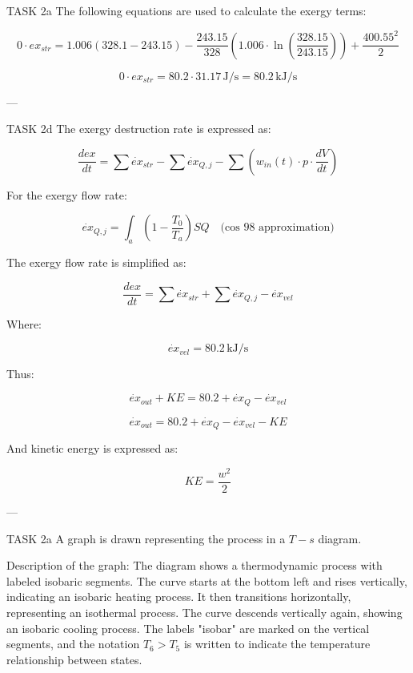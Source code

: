 TASK 2a  
The following equations are used to calculate the exergy terms:  

\[
0 \cdot ex_{str} = 1.006 (328.1 - 243.15) - \frac{243.15}{328} \left( 1.006 \cdot \ln \left( \frac{328.15}{243.15} \right) \right) + \frac{400.55^2}{2}
\]

\[
0 \cdot ex_{str} = 80.2 \cdot 31.17 \, \text{J/s} = 80.2 \, \text{kJ/s}
\]

---

TASK 2d  
The exergy destruction rate is expressed as:  

\[
\frac{d ex}{dt} = \sum \dot{ex}_{str} - \sum \dot{ex}_{Q,j} - \sum \left( w_{in}(t) \cdot p \cdot \frac{dV}{dt} \right)
\]

For the exergy flow rate:  

\[
\dot{ex}_{Q,j} = \int_a \left( 1 - \frac{T_0}{T_a} \right) SQ \quad \text{(cos 98 approximation)}
\]

The exergy flow rate is simplified as:  

\[
\frac{d ex}{dt} = \sum \dot{ex}_{str} + \sum \dot{ex}_{Q,j} - \dot{ex}_{vel}
\]

Where:  

\[
\dot{ex}_{vel} = 80.2 \, \text{kJ/s}
\]

Thus:  

\[
\dot{ex}_{out} + KE = 80.2 + \dot{ex}_{Q} - \dot{ex}_{vel}
\]

\[
\dot{ex}_{out} = 80.2 + \dot{ex}_{Q} - \dot{ex}_{vel} - KE
\]

And kinetic energy is expressed as:  

\[
KE = \frac{w^2}{2}
\]

---

TASK 2a  
A graph is drawn representing the process in a \( T-s \) diagram.  

Description of the graph:  
The diagram shows a thermodynamic process with labeled isobaric segments. The curve starts at the bottom left and rises vertically, indicating an isobaric heating process. It then transitions horizontally, representing an isothermal process. The curve descends vertically again, showing an isobaric cooling process. The labels "isobar" are marked on the vertical segments, and the notation \( T_6 > T_5 \) is written to indicate the temperature relationship between states.